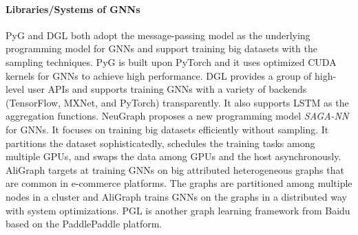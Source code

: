 \paragraph{Libraries/Systems of GNNs}

PyG \cite{PyG} and DGL \cite{DGL} both adopt the message-passing model as the underlying programming model for GNNs and support training big datasets with the sampling techniques.
PyG \cite{PyG} is built upon PyTorch and it uses optimized CUDA kernels for GNNs to achieve high performance.
DGL \cite{DGL} provides a group of high-level user APIs and supports training GNNs with a variety of backends (TensorFlow, MXNet, and PyTorch) transparently.
It also supports LSTM as the aggregation functions.
NeuGraph \cite{ma2019_neugraph} proposes a new programming model \emph{SAGA-NN} for GNNs.
It focuses on training big datasets efficiently without sampling.
It partitions the dataset sophisticatedly, schedules the training tasks among multiple GPUs, and swaps the data among GPUs and the host asynchronously.
AliGraph \cite{zhu2019_aligraph} targets at training GNNs on big attributed heterogeneous graphs that are common in e-commerce platforms.
The graphs are partitioned among multiple nodes in a cluster and AliGraph trains GNNs on the graphs in a distributed way with system optimizations.
PGL \cite{PGL} is another graph learning framework from Baidu based on the PaddlePaddle platform.
